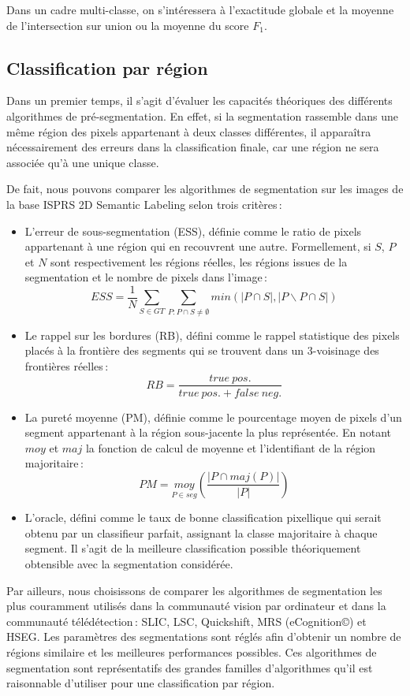 Dans un cadre multi-classe, on s'intéressera à l'exactitude globale et la moyenne de l'intersection sur union ou la moyenne du score $F_1$.

\subsection{Classification par région}

Dans un premier temps, il s'agit d'évaluer les capacités théoriques des différents algorithmes de pré-segmentation. En effet, si la segmentation rassemble dans une même région des pixels appartenant à deux classes différentes, il apparaîtra nécessairement des erreurs dans la classification finale, car une région ne sera associée qu'à une unique classe.

De fait, nous pouvons comparer les algorithmes de segmentation sur les images de la base \gls{ISPRS} 2D Semantic Labeling selon trois critères\,:
\begin{itemize}
  \item L'erreur de sous-segmentation (ESS), définie comme le ratio de pixels appartenant à une région qui en recouvrent une autre. Formellement, si $S$, $P$ et $N$ sont respectivement les régions réelles, les régions issues de la segmentation et le nombre de pixels dans l'image\,:
  $$ESS = \frac{1}{N} \sum_{S \in GT} \sum_{P : P \cap S \neq \emptyset} min(|P \cap S|, |P \backslash P \cap S|)$$
  \item Le rappel sur les bordures (RB), défini comme le rappel statistique des pixels placés à la frontière des segments qui se trouvent dans un 3-voisinage des frontières réelles\,:
  $$RB =  \frac{true\ pos.}{true\ pos. + false\ neg.}$$
  \item La pureté moyenne (PM), définie comme le pourcentage moyen de pixels d'un segment appartenant à la région sous-jacente la plus représentée. En notant $moy$ et $maj$ la fonction de calcul de moyenne et l'identifiant de la région majoritaire\,:
  $$PM = \underset{P \in seg}{moy} \left(\frac{| P \cap maj(P)|}{| P |}\right)$$
  \item L'oracle, défini comme le taux de bonne classification pixellique qui serait obtenu par un classifieur parfait, assignant la classe majoritaire à chaque segment. Il s'agit de la meilleure classification possible théoriquement obtensible avec la segmentation considérée.
\end{itemize}

Par ailleurs, nous choisissons de comparer les algorithmes de segmentation les plus couramment utilisés dans la communauté vision par ordinateur et dans la communauté télédétection\,: \gls{SLIC}, \gls{LSC}, Quickshift, \gls{MRS} (eCognition\copyright) et \gls{HSEG}. Les paramètres des segmentations sont réglés afin d'obtenir un nombre de régions similaire et les meilleures performances possibles. Ces algorithmes de segmentation sont représentatifs des grandes familles d'algorithmes qu'il est raisonnable d'utiliser pour une classification par région.

